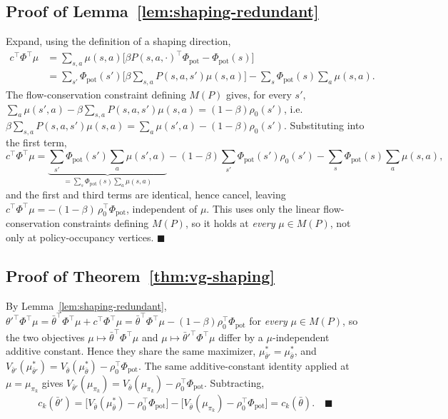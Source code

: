 \documentclass{article}
\begin{document}
\subsection{Proof of Lemma~\ref{lem:shaping-redundant}}
\label{app:proof-shaping-redundant}

Expand, using the definition of a shaping direction,
\begin{align*}
c^\top\Phi^\top\mu &= \sum_{s,a}\mu(s,a)\big[\beta P(s,a,\cdot)^\top\Phi_{\mathrm{pot}}
- \Phi_{\mathrm{pot}}(s)\big] \\
&= \sum_{s'}\Phi_{\mathrm{pot}}(s')\Big[\beta\sum_{s,a}P(s,a,s')\mu(s,a)\Big]
- \sum_s\Phi_{\mathrm{pot}}(s)\sum_a\mu(s,a).
\end{align*}
The flow-conservation constraint defining $M(P)$ gives, for every $s'$,
$\sum_a\mu(s',a) - \beta\sum_{s,a}P(s,a,s')\mu(s,a) = (1-\beta)\rho_0(s')$, i.e.
$\beta\sum_{s,a}P(s,a,s')\mu(s,a) = \sum_a\mu(s',a) - (1-\beta)\rho_0(s')$.
Substituting into the first term,
\[
c^\top\Phi^\top\mu = \underbrace{\sum_{s'}\Phi_{\mathrm{pot}}(s')\sum_a\mu(s',a)}_{=\sum_s\Phi_{\mathrm{pot}}(s)\sum_a\mu(s,a)}
- (1-\beta)\sum_{s'}\Phi_{\mathrm{pot}}(s')\rho_0(s')
- \sum_s\Phi_{\mathrm{pot}}(s)\sum_a\mu(s,a),
\]
and the first and third terms are identical, hence cancel, leaving
$c^\top\Phi^\top\mu = -(1-\beta)\,\rho_0^\top\Phi_{\mathrm{pot}}$, independent of
$\mu$. This uses only the linear flow-conservation constraints defining
$M(P)$, so it holds at \emph{every} $\mu\in M(P)$, not only at policy-occupancy
vertices. $\blacksquare$

\subsection{Proof of Theorem~\ref{thm:vg-shaping}}
\label{app:proof-vg-shaping}

By Lemma~\ref{lem:shaping-redundant}, $\theta'^\top\Phi^\top\mu =
\bar\theta^\top\Phi^\top\mu + c^\top\Phi^\top\mu = \bar\theta^\top\Phi^\top\mu -
(1-\beta)\rho_0^\top\Phi_{\mathrm{pot}}$ for \emph{every} $\mu\in M(P)$, so the
two objectives $\mu\mapsto\bar\theta^\top\Phi^\top\mu$ and
$\mu\mapsto\bar\theta'^\top\Phi^\top\mu$ differ by a $\mu$-independent additive
constant. Hence they share the same maximizer, $\mu^*_{\bar\theta'} =
\mu^*_{\bar\theta}$, and
$V_{\bar\theta'}(\mu^*_{\bar\theta'}) = V_{\bar\theta}(\mu^*_{\bar\theta}) -
\rho_0^\top\Phi_{\mathrm{pot}}$. The same additive-constant identity applied at
$\mu=\mu_{\pi_k}$ gives $V_{\bar\theta'}(\mu_{\pi_k}) =
V_{\bar\theta}(\mu_{\pi_k}) - \rho_0^\top\Phi_{\mathrm{pot}}$. Subtracting,
\[
c_k(\bar\theta') = \big[V_{\bar\theta}(\mu^*_{\bar\theta}) -
\rho_0^\top\Phi_{\mathrm{pot}}\big] - \big[V_{\bar\theta}(\mu_{\pi_k}) -
\rho_0^\top\Phi_{\mathrm{pot}}\big] = c_k(\bar\theta). \quad\blacksquare
\]
\end{document}
